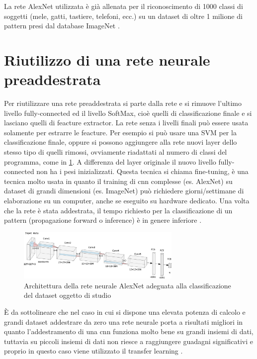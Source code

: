 La rete AlexNet utilizzata è già allenata per il riconoscimento di 1000 classi di soggetti (mele, gatti, tastiere, telefoni, ecc.) su un dataset di oltre 1 milione di pattern presi dal database ImageNet \cite{alexnet}.

\section{Riutilizzo di una rete neurale preaddestrata}\label{riutilizzo-di-una-rete-neurale-preaddestrata}

Per riutilizzare una rete preaddestrata si parte dalla rete e si rimuove l'ultimo livello \gls{fully-connected} ed il livello \gls{SoftMax}, cioè quelli di classificazione finale e si lasciano quelli di feacture extractor. La rete senza i livelli finali può essere usata solamente per estrarre le feacture. Per esempio si può usare una SVM per la classificazione finale, oppure si possono  aggiungere alla rete nuovi layer dello stesso tipo di quelli rimossi, ovviamente riadattati al numero di classi del programma, come in \cref{fig:alexnet-tl}. A differenza del layer originale il nuovo  livello \gls{fully-connected} non ha i \gls{pesi} inizializzati. Questa tecnica si chiama fine-tuning, è una tecnica molto usata in quanto il training di \gls{cnn} complesse (es. AlexNet) su dataset di grandi dimensioni (es. ImageNet) può richiedere giorni/settimane di elaborazione su un computer, anche se eseguito su hardware dedicato. Una volta che la rete è stata addestrata, il tempo richiesto per la classificazione di un  pattern (\gls{propagazione forward} o inference) è in genere inferiore \cite{yosinski_tl} \cite{unibo_maltoni_ml}.

\begin{figure}[ht]
    \centering
    \includegraphics[width=0.7\textwidth]{addestramento-rete-neurale/alexnet-tl.pdf}
    \caption{Architettura della rete neurale AlexNet adeguata alla classificazione del dataset oggetto di studio}
    \label{fig:alexnet-tl}
\end{figure}

È da sottolineare che nel caso in cui si dispone una elevata potenza di calcolo e grandi dataset addestrare da zero una rete neurale porta a risultati migliori in quanto l'addestramento di una \gls{cnn} funziona molto bene su grandi insiemi di dati, tuttavia su piccoli insiemi di dati non riesce a raggiungere guadagni significativi e proprio in questo caso viene utilizzato il transfer learning \cite{joel_tl}.

